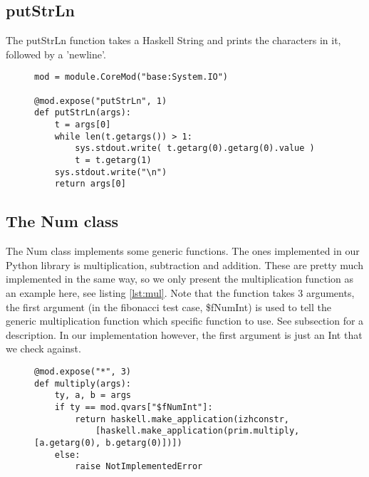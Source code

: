 \subsection{putStrLn}

The putStrLn function takes a Haskell String and prints the characters in it,
followed by a 'newline'.

\begin{figure}[H]
\lstset{ %
language=Python,
caption=Implementation of the putStrLn function.,
label=lst:put
}

\begin{lstlisting}
mod = module.CoreMod("base:System.IO")

@mod.expose("putStrLn", 1)
def putStrLn(args):
    t = args[0]
    while len(t.getargs()) > 1:
        sys.stdout.write( t.getarg(0).getarg(0).value )
        t = t.getarg(1)
    sys.stdout.write("\n")
    return args[0]
\end{lstlisting}
\end{figure}


\subsection{The Num class}

The Num class implements some generic functions. The ones implemented
in our Python library is multiplication, subtraction and addition. These
are pretty much implemented in the same way, so we only present the
multiplication function as an example here, see listing \ref{lst:mul}.
Note that the function takes 3 arguments, the first argument 
(in the fibonacci test case, \$fNumInt) is used to tell the
generic multiplication function which specific function to use.
See subsection \label{subsec:classes} for a description. In our 
implementation however, the first argument is just an Int that we 
check against.

\begin{figure}[H]
\lstset{ %
language=Python,
caption=Implementation of the generic multiplication function.,
label=lst:mul
}

\begin{lstlisting}
@mod.expose("*", 3)
def multiply(args):
    ty, a, b = args
    if ty == mod.qvars["$fNumInt"]:
        return haskell.make_application(izhconstr,
            [haskell.make_application(prim.multiply, [a.getarg(0), b.getarg(0)])])
    else:
        raise NotImplementedError
\end{lstlisting}
\end{figure}


